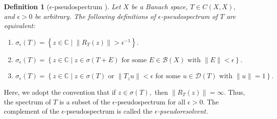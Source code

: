 \documentclass[12pt,a4paper]{article}
\theoremstyle{boldthm}
\theoremstyle{bolddefn}
\newtheorem{definition}[theorem]{Definition}
\begin{document}
\begin{definition}[{$\epsilon$-pseudospectrum \cite[4.3, 4.4, 4.5]{krey}}] \label{pseudo def}
    Let $X$ be a Banach space, $T\in C(X, X),$ and $\epsilon>0$ be arbitrary. The
    following definitions of $\epsilon$-pseudospectrum of $T$ are equivalent:
    \begin{enumerate}
        \item
            $\sigma_\epsilon(T)
            =
            \left\{
            z\in\mathbb{C}
            \mid
            \left\|R_T(z) \right\|>\epsilon^{-1}
            \right\}.$
        \item
            $\sigma_\epsilon(T)
            =
            \left\{
            z\in\mathbb{C}
            \mid
            z\in\sigma(T+E)
            \text{ for some } E\in\mathcal{B}(X)
            \text{ with } \|E\|<\epsilon
            \right\}.$
        \item $\sigma_\epsilon(T)
            =
            \left\{
            z\in\mathbb{C}
            \mid
            z\in\sigma(T)
            \text{ or }
            \|T_zu\|<\epsilon
            \text{ for some } u\in\mathcal{D}(T)
            \text{ with } \|u\|=1
            \right\}.$
    \end{enumerate}

\end{definition}
Here, we adopt the convention that if $z \in \sigma(T),$ then $\| R_T(z) \| =\infty.$ Thus, the spectrum of $T$ is a subset of the $\epsilon$-pseudospectrum for all $\epsilon > 0.$ The complement of the $\epsilon$-pseudospectrum is called the \textit{$\epsilon$-pseudoresolvent.}
\end{document}
